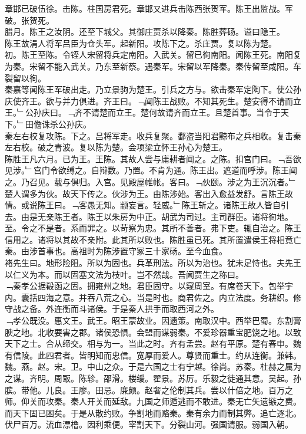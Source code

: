 \documentclass{zhvt-classic}
\begin{document}
\hspace*{2em}章邯已破伍徐。击陈。柱国房君死。章邯又进兵击陈西张贺军。陈王出监战。军破。张贺死。\\
\hspace*{2em}腊月。陈王之汝阴。还至下城父。其御庄贾杀以降秦。陈胜葬砀。谥曰隐王。\\
\hspace*{2em}陈王故涓人将军吕臣为仓头军。起新阳。攻陈下之。杀庄贾。复以陈为楚。\\
\hspace*{2em}初。陈王至陈。令铚人宋留将兵定南阳。入武关。留已徇南阳。闻陈王死。南阳复为秦。宋留不能入武关。乃东至新蔡。遇秦军。宋留以军降秦。秦传留至咸阳。车裂留以徇。\\
\hspace*{2em}秦嘉等闻陈王军破出走。乃立景驹为楚王。引兵之方与。欲击秦军定陶下。使公孙庆使齐王。欲与并力俱进。齐王曰。﹁闻陈王战败。不知其死生。楚安得不请而立王。﹂公孙庆曰。﹁齐不请楚而立王。楚何故请齐而立王。且楚首事。当令于天下。﹂田儋诛杀公孙庆。\\
\hspace*{2em}秦左右校复攻陈。下之。吕将军走。收兵复聚。鄱盗当阳君黥布之兵相收。复击秦左右校。破之青波。复以陈为楚。会项梁立怀王孙心为楚王。\\
\hspace*{2em}陈胜王凡六月。已为王。王陈。其故人尝与庸耕者闻之。之陈。扣宫门曰。﹁吾欲见涉。﹂宫门令欲缚之。自辩数。乃置。不肯为通。陈王出。遮道而呼涉。陈王闻之。乃召见。载与俱归。入宫。见殿屋帷帐。客曰。﹁伙颐。涉之为王沉沉者。﹂楚人谓多为伙。故天下传之。伙涉为王。由陈涉始。客出入愈益发舒。言陈王故情。或说陈王曰。﹁客愚无知。颛妄言。轻威。﹂陈王斩之。诸陈王故人皆自引去。由是无亲陈王者。陈王以朱房为中正。胡武为司过。主司群臣。诸将徇地。至。令之不是者。系而罪之。以苛察为忠。其所不善者。弗下吏。辄自治之。陈王信用之。诸将以其故不亲附。此其所以败也。陈胜虽已死。其所置遣侯王将相竟亡秦。由涉首事也。高祖时为陈涉置守冢三十家砀。至今血食。\\
\hspace*{2em}褚先生曰。地形险阻。所以为固也。兵革刑法。所以为治也。犹未足恃也。夫先王以仁义为本。而以固塞文法为枝叶。岂不然哉。吾闻贾生之称曰。\\
\hspace*{2em}﹁秦孝公据殽函之固。拥雍州之地。君臣固守。以窥周室。有席卷天下。包举宇内。囊括四海之意。并吞八荒之心。当是时也。商君佐之。内立法度。务耕织。修守战之备。外连衡而斗诸侯。于是秦人拱手而取西河之外。\\
\hspace*{2em}﹁孝公既没。惠文王。武王。昭王蒙故业。因遗策。南取汉中。西举巴蜀。东割膏腴之地。北收要害之郡。诸侯恐惧。会盟而谋弱秦。不爱珍器重宝肥饶之地。以致天下之士。合从缔交。相与为一。当此之时。齐有孟尝。赵有平原。楚有春申。魏有信陵。此四君者。皆明知而忠信。宽厚而爱人。尊贤而重士。约从连衡。兼韩。魏。燕。赵。宋。卫。中山之众。于是六国之士有宁越。徐尚。苏秦。杜赫之属为之谋。齐明。周冣。陈轸。邵滑。楼缓。翟景。苏厉。乐毅之徒通其意。吴起。孙膑。带他。儿良。王廖。田忌。廉颇。赵奢之伦制其兵。尝以什倍之地。百万之师。仰关而攻秦。秦人开关而延敌。九国之师遁逃而不敢进。秦无亡矢遗镞之费。而天下固已困矣。于是从散约败。争割地而赂秦。秦有余力而制其弊。追亡逐北。伏尸百万。流血漂橹。因利乘便。宰割天下。分裂山河。强国请服。弱国入朝。\\
\end{document}
